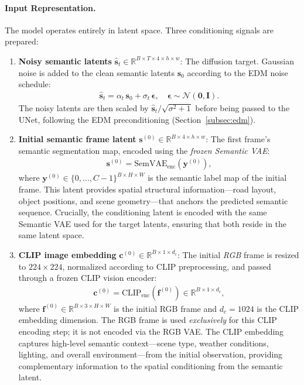 \paragraph{Input Representation.}
The model operates entirely in latent space. Three conditioning signals are prepared:

\begin{enumerate}
    \item \textbf{Noisy semantic latents} $\hat{\mathbf{s}}_t \in \mathbb{R}^{B \times T \times 4 \times h \times w}$: The diffusion target. Gaussian noise is added to the clean semantic latents $\mathbf{s}_0$ according to the EDM noise schedule:
    \begin{align}
        \hat{\mathbf{s}}_t = \alpha_t\, \mathbf{s}_0 + \sigma_t\, \boldsymbol{\epsilon}, \quad \boldsymbol{\epsilon} \sim \mathcal{N}(\mathbf{0}, \mathbf{I}).
        \label{eq:noisy_semantic}
    \end{align}
    The noisy latents are then scaled by $\hat{\mathbf{s}}_t / \sqrt{\sigma^2 + 1}$ before being passed to the UNet, following the EDM preconditioning (Section~\ref{subsec:edm}).

    \item \textbf{Initial semantic frame latent} $\mathbf{s}^{(0)} \in \mathbb{R}^{B \times 4 \times h \times w}$: The first frame's semantic segmentation map, encoded using the \emph{frozen Semantic VAE}:
    \begin{align}
        \mathbf{s}^{(0)} = \text{SemVAE}_{\text{enc}}(\mathbf{y}^{(0)}),
        \label{eq:initial_frame_latent}
    \end{align}
    where $\mathbf{y}^{(0)} \in \{0, \ldots, C-1\}^{B \times H \times W}$ is the semantic label map of the initial frame. This latent provides spatial structural information---road layout, object positions, and scene geometry---that anchors the predicted semantic sequence. Crucially, the conditioning latent is encoded with the same Semantic VAE used for the target latents, ensuring that both reside in the same latent space.

    \item \textbf{CLIP image embedding} $\mathbf{c}^{(0)} \in \mathbb{R}^{B \times 1 \times d_c}$: The initial \emph{RGB} frame is resized to $224 \times 224$, normalized according to CLIP preprocessing, and passed through a frozen CLIP vision encoder:
    \begin{align}
        \mathbf{c}^{(0)} = \text{CLIP}_{\text{enc}}(\mathbf{f}^{(0)}) \in \mathbb{R}^{B \times 1 \times d_c},
        \label{eq:clip_embedding}
    \end{align}
    where $\mathbf{f}^{(0)} \in \mathbb{R}^{B \times 3 \times H \times W}$ is the initial RGB frame and $d_c = 1024$ is the CLIP embedding dimension. The RGB frame is used \emph{exclusively} for this CLIP encoding step; it is not encoded via the RGB VAE. The CLIP embedding captures high-level semantic context---scene type, weather conditions, lighting, and overall environment---from the initial observation, providing complementary information to the spatial conditioning from the semantic latent.
\end{enumerate}

